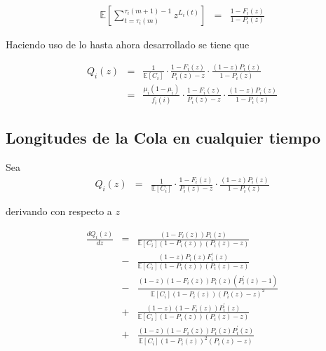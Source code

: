 \documentclass{article}
\newcommand{\esp}{\mathbb{E}}
\begin{document}
\begin{eqnarray*}
\esp\left[\sum_{t=\tau_{i}\left(m\right)}^{\tau_{i}\left(m+1\right)-1}z^{L_{i}\left(t\right)}\right]&=&\frac{1-F_{i}\left(z\right)}{1-P_{i}\left(z\right)}
\end{eqnarray*}

Haciendo uso de lo hasta ahora desarrollado se tiene que

\begin{eqnarray*}
Q_{i}\left(z\right)&=&\frac{1}{\esp\left[C_{i}\right]}\cdot\frac{1-F_{i}\left(z\right)}{P_{i}\left(z\right)-z}\cdot\frac{\left(1-z\right)P_{i}\left(z\right)}{1-P_{i}\left(z\right)}\\
&=&\frac{\mu_{i}\left(1-\mu_{i}\right)}{f_{i}\left(i\right)}\cdot\frac{1-F_{i}\left(z\right)}{P_{i}\left(z\right)-z}\cdot\frac{\left(1-z\right)P_{i}\left(z\right)}{1-P_{i}\left(z\right)}
\end{eqnarray*}


\subsection{Longitudes de la Cola en cualquier tiempo}
Sea 
\begin{eqnarray*}
Q_{i}\left(z\right)&=&\frac{1}{\esp\left[C_{i}\right]}\cdot\frac{1-F_{i}\left(z\right)}{P_{i}\left(z\right)-z}\cdot\frac{\left(1-z\right)P_{i}\left(z\right)}{1-P_{i}\left(z\right)}
\end{eqnarray*}

derivando con respecto a $z$



\begin{eqnarray*}
\frac{d Q_{i}\left(z\right)}{d z}&=&\frac{\left(1-F_{i}\left(z\right)\right)P_{i}\left(z\right)}{\esp\left[C_{i}\right]\left(1-P_{i}\left(z\right)\right)\left(P_{i}\left(z\right)-z\right)}\\
&-&\frac{\left(1-z\right)P_{i}\left(z\right)F_{i}^{'}\left(z\right)}{\esp\left[C_{i}\right]\left(1-P_{i}\left(z\right)\right)\left(P_{i}\left(z\right)-z\right)}\\
&-&\frac{\left(1-z\right)\left(1-F_{i}\left(z\right)\right)P_{i}\left(z\right)\left(P_{i}^{'}\left(z\right)-1\right)}{\esp\left[C_{i}\right]\left(1-P_{i}\left(z\right)\right)\left(P_{i}\left(z\right)-z\right)^{2}}\\
&+&\frac{\left(1-z\right)\left(1-F_{i}\left(z\right)\right)P_{i}^{'}\left(z\right)}{\esp\left[C_{i}\right]\left(1-P_{i}\left(z\right)\right)\left(P_{i}\left(z\right)-z\right)}\\
&+&\frac{\left(1-z\right)\left(1-F_{i}\left(z\right)\right)P_{i}\left(z\right)P_{i}^{'}\left(z\right)}{\esp\left[C_{i}\right]\left(1-P_{i}\left(z\right)\right)^{2}\left(P_{i}\left(z\right)-z\right)}
\end{eqnarray*}
\end{document}
